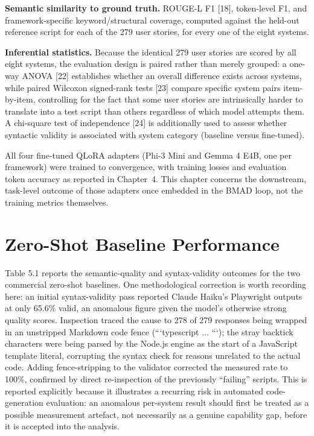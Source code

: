 \textbf{Semantic similarity to ground truth.} ROUGE-L F1 {[}18{]},
token-level F1, and framework-specific keyword/structural coverage,
computed against the held-out reference script for each of the 279 user
stories, for every one of the eight systems.

\textbf{Inferential statistics.} Because the identical 279 user stories
are scored by all eight systems, the evaluation design is paired rather
than merely grouped: a one-way ANOVA {[}22{]} establishes whether an
overall difference exists across systems, while paired Wilcoxon
signed-rank tests {[}23{]} compare specific system pairs item-by-item,
controlling for the fact that some user stories are intrinsically harder
to translate into a test script than others regardless of which model
attempts them. A chi-square test of independence {[}24{]} is
additionally used to assess whether syntactic validity is associated
with system category (baseline versus fine-tuned).

All four fine-tuned QLoRA adapters (Phi-3 Mini and Gemma 4 E4B, one per
framework) were trained to convergence, with training losses and
evaluation token accuracy as reported in Chapter~4. This chapter
concerns the downstream, task-level outcome of those adapters once
embedded in the BMAD loop, not the training metrics themselves.

\section{Zero-Shot Baseline Performance}

Table 5.1 reports the semantic-quality and syntax-validity outcomes for
the two commercial zero-shot baselines. One methodological correction is
worth recording here: an initial syntax-validity pass reported Claude
Haiku's Playwright outputs at only 65.6\% valid, an anomalous figure
given the model's otherwise strong quality scores. Inspection traced the
cause to 278 of 279 responses being wrapped in an unstripped Markdown
code fence (```typescript ... ```); the stray backtick characters were
being parsed by the Node.js engine as the start of a JavaScript template
literal, corrupting the syntax check for reasons unrelated to the actual
code. Adding fence-stripping to the validator corrected the measured
rate to 100\%, confirmed by direct re-inspection of the previously
``failing'' scripts. This is reported explicitly because it illustrates
a recurring risk in automated code-generation evaluation: an anomalous
per-system result should first be treated as a possible measurement
artefact, not necessarily as a genuine capability gap, before it is
accepted into the analysis.

